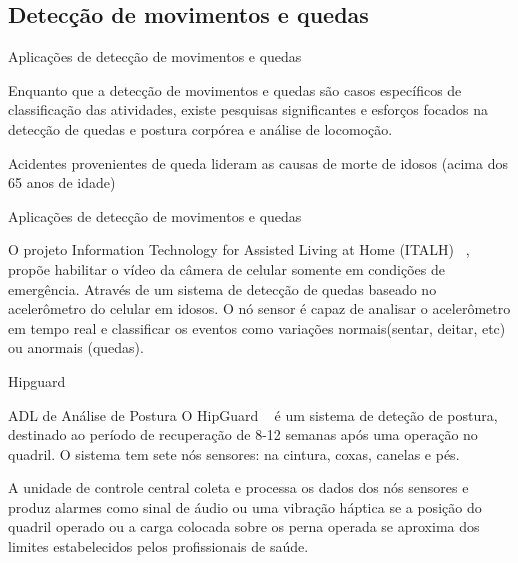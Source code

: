 \documentclass{beamer}
\begin{document}
\subsection{Detecção de movimentos e quedas}
\begin{frame}{Aplicações de detecção de movimentos e quedas}
  \begin{block}{}
     Enquanto que a detecção de movimentos e quedas são casos específicos de classificação das atividades, existe pesquisas significantes e esforços focados na detecção de quedas e postura corpórea e análise de locomoção.
  \end{block}

  \begin{alertblock}{}
     Acidentes provenientes de queda lideram as causas de morte de idosos (acima dos 65 anos de idade)
  \end{alertblock}
\end{frame}

\begin{frame}{Aplicações de detecção de movimentos e quedas}
  \begin{block}{}
    O projeto Information Technology for Assisted Living at Home
(ITALH) ~\cite{han05}, propõe habilitar o vídeo da câmera de celular somente em condições de emergência. Através de um sistema de detecção de quedas baseado no acelerômetro do celular em idosos. O nó sensor é capaz de analisar o acelerômetro em tempo real e classificar os eventos como variações normais(sentar, deitar, etc) ou anormais (quedas).
  \end{block}
\end{frame}

\begin{frame}{Hipguard} 
    \begin{block}{ADL de Análise de Postura}
      O HipGuard ~\cite{ket08} é um sistema de deteção de postura, destinado ao período de recuperação de 8-12 semanas após uma operação no quadril. O sistema tem sete nós sensores: na cintura, coxas, canelas e pés.     
    \end{block}

    \begin{block}{}
      A unidade de controle central coleta e processa os dados dos nós sensores e produz alarmes como sinal de áudio ou uma vibração háptica se a posição do quadril operado ou a carga colocada sobre os perna operada se aproxima dos limites estabelecidos pelos profissionais de saúde.
    \end{block}
\end{frame}
\end{document}
